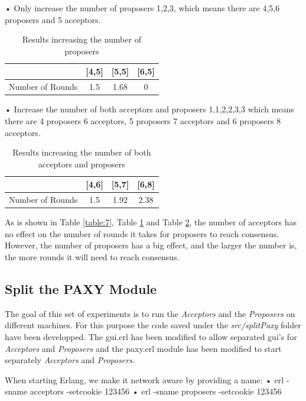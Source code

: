 • Only increase the number of proposers 1,2,3, which means there are
4,5,6 proposers and 5 acceptors.\newline
\begin{table}[h!]
  \centering
  \begin{tabular}{ |c | c | c | c | }
    \hline
                     & [4,5] & [5,5] & [6,5] \\ \hline
    Number of Rounds & 1.5 & 1.68 & 0  \\ \hline
  \end{tabular}
  \caption{Results increasing the number of proposers}
  \label{table:8}
\end{table}

• Increase the number of both acceptors and proposers {1,1},{2,2},{3,3}
which means there are 4 proposers 6 acceptors, 5 proposers 7 acceptors
and 6 proposers 8 acceptors.\newline
\begin{table}[h!]
  \centering
  \begin{tabular}{ |c | c | c | c| }
    \hline
                     & [4,6] & [5,7] & [6,8] \\ \hline
    Number of Rounds & 1.5 & 1.92 & 2.38  \\ \hline
  \end{tabular}
  \caption{Results increasing the number of both acceptors and proposers}
  \label{table:9}
\end{table}

As is shown in Table \ref{table:7}, Table \ref{table:8} and Table \ref{table:9}, the number
of acceptors has no effect on the number of rounds it takes for proposers 
to reach consensus. However, the number of proposers has a big effect, and
the larger the number is, the more rounds it will need to reach consensus.

\subsection{Split the PAXY Module}
The goal of this set of experiments is to run the \textit{Acceptors} and the
\textit{Proposers} on different machines. For this purpose the code saved
under the \textit{src/splitPaxy} folder have been developped. The gui.erl has been
modified to allow separated gui's for \textit{Acceptors} and \textit{Proposers} and
the paxy.erl module has been modified to start separately \textit{Acceptors} and \textit{Proposers}.

When starting Erlang, we make it network aware by providing a name: \newline
• erl -sname acceptors -setcookie 123456 \newline
• erl -sname proposers -setcookie 123456 \newline

